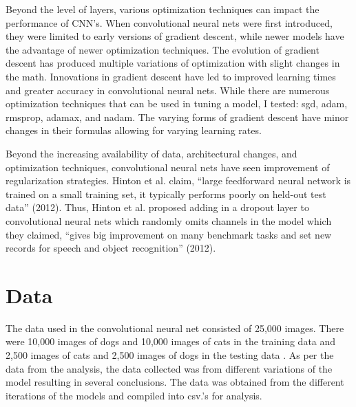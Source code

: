 \documentclass[12pt,english]{article}
\begin{document}
Beyond the level of layers, various optimization techniques can impact the performance of CNN’s. When convolutional neural nets were first introduced, they were limited to early versions of gradient descent, while newer models have the advantage of newer optimization techniques. The evolution of gradient descent has produced multiple variations of optimization with slight changes in the math. Innovations in gradient descent have led to improved learning times and greater accuracy in convolutional neural nets. While there are numerous optimization techniques that can be used in tuning a model, I tested: sgd, adam, rmsprop, adamax, and nadam. The varying forms of gradient descent have minor changes in their formulas allowing for varying learning rates. \par

Beyond the increasing availability of data, architectural changes, and optimization techniques, convolutional neural nets have seen improvement of regularization strategies. Hinton et al. claim, “large feedforward neural network is trained on a small training set, it typically performs poorly on held-out test data” (2012). Thus, Hinton et al. proposed adding in a dropout layer to convolutional neural nets which randomly omits channels in the model which they claimed, “gives big improvement on many benchmark tasks and set new records for speech and object recognition” (2012).\par


\section{Data}
The data used in the convolutional neural net consisted of 25,000 images. There were 10,000 images of dogs and 10,000 images of cats in the training data and 2,500 images of cats and 2,500 images of dogs in the testing data \cite{anudc:4896}. As per the data from the analysis, the data collected was from different variations of the model resulting in several conclusions. The data was obtained from the different iterations of the models and compiled into csv.’s for analysis.\par
\end{document}
